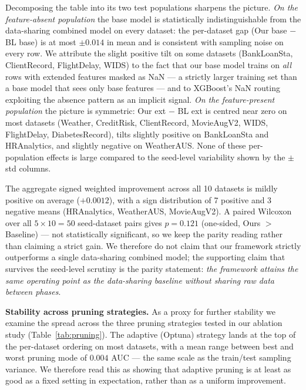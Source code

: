 \documentclass[sigconf]{acmart}
\begin{document}
\begin{itemize}
Decomposing the table into its two test populations sharpens the picture. \emph{On the feature-absent population} the base model is statistically indistinguishable from the data-sharing combined model on every dataset: the per-dataset gap (Our base $-$ BL base) is at most $\pm 0.014$ in mean and is consistent with sampling noise on every row. We attribute the slight positive tilt on some datasets (BankLoanSta, ClientRecord, FlightDelay, WIDS) to the fact that our base model trains on \textit{all} rows with extended features masked as NaN --- a strictly larger training set than a base model that sees only base features --- and to XGBoost's NaN routing exploiting the absence pattern as an implicit signal. \emph{On the feature-present population} the picture is symmetric: Our ext $-$ BL ext is centred near zero on most datasets (Weather, CreditRisk, ClientRecord, MovieAugV2, WIDS, FlightDelay, DiabetesRecord), tilts slightly positive on BankLoanSta and HRAnalytics, and slightly negative on WeatherAUS. None of these per-population effects is large compared to the seed-level variability shown by the $\pm$std columns.

The aggregate signed weighted improvement across all 10 datasets is mildly positive on average ($+0.0012$), with a sign distribution of 7 positive and 3 negative means (HRAnalytics, WeatherAUS, MovieAugV2). A paired Wilcoxon over all $5\times 10 = 50$ seed-dataset pairs gives $p = 0.121$ (one-sided, Ours $>$ Baseline) --- not statistically significant, so we keep the parity reading rather than claiming a strict gain. We therefore do not claim that our framework strictly outperforms a single data-sharing combined model; the supporting claim that survives the seed-level scrutiny is the parity statement: \emph{the framework attains the same operating point as the data-sharing baseline without sharing raw data between phases}.

\textbf{Stability across pruning strategies.} As a proxy for further stability we examine the spread across the three pruning strategies tested in our ablation study (Table~\ref{tab:pruning}). The adaptive (Optuna) strategy lands at the top of the per-dataset ordering on most datasets, with a mean range between best and worst pruning mode of $0.004$ AUC --- the same scale as the train/test sampling variance. We therefore read this as showing that adaptive pruning is at least as good as a fixed setting in expectation, rather than as a uniform improvement.


\end{itemize}
\end{document}
